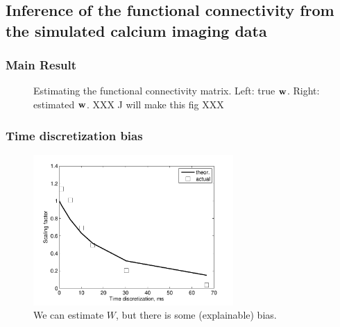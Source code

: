
\subsection{Inference of the functional connectivity from the simulated calcium imaging data} \label{sec:results:inference}

\clearpage
\subsubsection{Main Result}

\begin{figure}[h]
\caption{Estimating the functional connectivity matrix. Left: true $\mathbf{w}$.  Right: estimated $\mathbf{w}$.  XXX J will make this fig XXX}
\label{fig:w}
\end{figure}

\clearpage
\subsubsection{Time discretization bias}

\begin{figure}[h]
\centering
\includegraphics[width=3in]{../figs/Figure13_scalebiasvsframerate}
\caption{We can estimate $W$, but there is some (explainable) bias.}
\label{fig:bias}
\end{figure}

